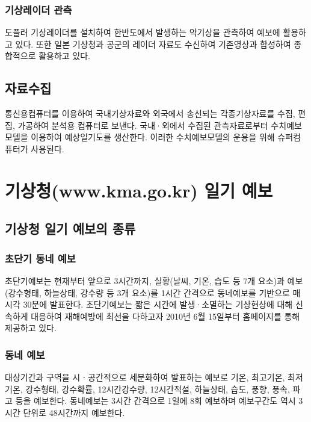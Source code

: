 \begin{corollary}
\subsection{기상레이더 관측}
도플러 기상레이더를 설치하여 한반도에서 발생하는 악기상을 관측하여 예보에 활용하고 있다. 또한 일본 기상청과 공군의 레이더 자료도 수신하여 기존영상과 합성하여 종합적으로 활용하고 있다.


\section{자료수집}
통신용컴퓨터를 이용하여 국내기상자료와 외국에서 송신되는 각종기상자료를 수집, 편집, 가공하여 분석용 컴퓨터로 보낸다. 국내·외에서 수집된 관측자료로부터 수치예보모델을 이용하여 예상일기도를 생산한다. 이러한 수치예보모델의 운용을 위해 슈퍼컴퓨터가 사용된다.




\chapter{기상청(www.kma.go.kr) 일기 예보}

\section{기상청 일기 예보의 종류}


\subsection{초단기 동네 예보}
초단기예보는 현재부터 앞으로 3시간까지, 실황(날씨, 기온, 습도 등 7개 요소)과 예보(강수형태, 하늘상태, 강수량 등 3개 요소)를 1시간 간격으로 동네예보를 기반으로 매 시각 30분에 발표한다. 초단기예보는 짧은 시간에 발생·소멸하는 기상현상에 대해 신속하게 대응하여 재해예방에 최선을 다하고자 2010년 6월 15일부터 홈페이지를 통해 제공하고 있다.

\subsection{동네 예보}
대상기간과 구역을 시ㆍ공간적으로 세분화하여 발표하는 예보로 기온, 최고기온, 최저기온, 강수형태, 강수확률, 12시간강수량, 12시간적설, 하늘상태, 습도, 풍향, 풍속, 파고 등을 예보한다. 동네예보는 3시간 간격으로 1일에 8회 예보하며 예보구간도 역시 3시간 단위로 48시간까지 예보한다. 


\end{corollary}
